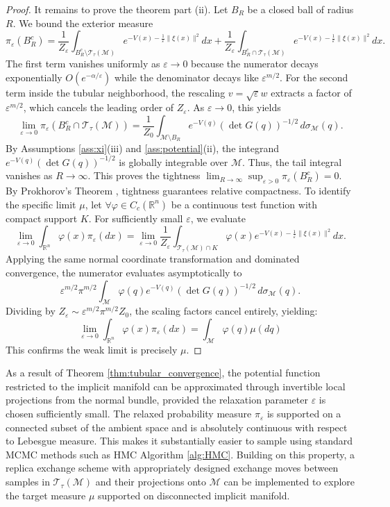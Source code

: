 \documentclass[12pt]{article}
\begin{document}
\begin{proof}
It remains to prove the theorem part (ii). Let $B_R$ be a closed ball of radius $R$. We bound the exterior measure
$$\pi_\varepsilon(B_R^c) = \frac{1}{Z_\varepsilon} \int_{B_R^c \setminus \mathcal{T}_\tau(\mathcal{M})} e^{-V(x) - \frac{1}{\varepsilon}\|\xi(x)\|^2} dx + \frac{1}{Z_\varepsilon} \int_{B_R^c \cap \mathcal{T}_\tau(\mathcal{M})} e^{-V(x) - \frac{1}{\varepsilon}\|\xi(x)\|^2} dx.$$
The first term vanishes uniformly as $\varepsilon \to 0$ because the numerator decays exponentially $O(e^{-\alpha/\varepsilon})$ while the denominator decays like $\varepsilon^{m/2}$. For the second term inside the tubular neighborhood, the rescaling $v = \sqrt{\varepsilon}w$ extracts a factor of $\varepsilon^{m/2}$, which cancels the leading order of $Z_\varepsilon$. As $\varepsilon \to 0$, this yields
$$\lim_{\varepsilon \to 0} \pi_\varepsilon(B_R^c \cap \mathcal{T}_\tau(\mathcal{M})) = \frac{1}{Z_0} \int_{\mathcal{M} \setminus B_R} e^{-V(q)} (\det G(q))^{-1/2} \, d\sigma_{\mathcal{M}}(q).$$
By Assumptions \ref{ass:xi}(iii) and \ref{ass:potential}(ii), the integrand $e^{-V(q)} (\det G(q))^{-1/2}$ is globally integrable over $\mathcal{M}$. Thus, the tail integral vanishes as $R \to \infty$. This proves the tightness
$\lim_{R \to \infty} \sup_{\varepsilon > 0} \pi_\varepsilon(B_R^c) = 0.$
By Prokhorov's Theorem \citep[Theorem 16.16]{billingsley2013}, tightness guarantees relative compactness. To identify the specific limit $\mu$, let $\forall \varphi \in C_c(\mathbb{R}^n)$ be a continuous test function with compact support $K$. For sufficiently small $\varepsilon$, we evaluate
$$\lim_{\varepsilon \to 0} \int_{\mathbb{R}^n} \varphi(x) \pi_\varepsilon(dx) = \lim_{\varepsilon \to 0} \frac{1}{Z_\varepsilon} \int_{\mathcal{T}_\tau(\mathcal{M}) \cap K} \varphi(x) e^{-V(x) - \frac{1}{\varepsilon}\|\xi(x)\|^2} dx.$$
Applying the same normal coordinate transformation and dominated convergence, the numerator evaluates asymptotically to
$$\varepsilon^{m/2} \pi^{m/2} \int_{\mathcal{M}} \varphi(q) e^{-V(q)} (\det G(q))^{-1/2} \, d\sigma_{\mathcal{M}}(q).$$
Dividing by $Z_\varepsilon \sim \varepsilon^{m/2} \pi^{m/2} Z_0$, the scaling factors cancel entirely, yielding:$$\lim_{\varepsilon \to 0} \int_{\mathbb{R}^n} \varphi(x) \pi_\varepsilon(dx) = \int_{\mathcal{M}} \varphi(q) \mu(dq)$$This confirms the weak limit is precisely $\mu$.

\end{proof}




As a result of Theorem \ref{thm:tubular_convergence}, the potential function
restricted to the implicit manifold can be approximated through invertible local
projections from the normal bundle, provided the relaxation parameter
$\varepsilon$ is chosen sufficiently small. The relaxed probability measure $\pi_\varepsilon$ is supported on a
connected subset of the ambient space and is absolutely continuous with respect
to Lebesgue measure.
This makes it substantially easier to sample using standard MCMC methods such as
HMC Algorithm \ref{alg:HMC}.
Building on this property, a replica exchange scheme with appropriately designed
exchange moves between samples in $\mathcal{T}_\tau(\mathcal{M})$ 
and their projections onto
$\mathcal{M}$ can be implemented to explore the target measure $\mu$ supported on disconnected implicit
manifold.
\end{document}
